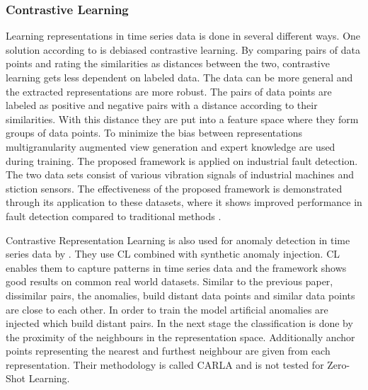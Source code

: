 
\subsubsection{Contrastive Learning}
Learning representations in time series data is done in several different ways. One solution according to  is debiased contrastive learning. By comparing pairs of data points and rating the similarities as distances between the two, contrastive learning gets less dependent on labeled data. The data can be more general and the extracted representations are more robust. The pairs of data points are labeled as positive and negative pairs with a distance according to their similarities. With this distance they are put into a feature space where they form groups of data points. To minimize the bias between representations multigranularity augmented view generation and expert knowledge are used during training. The proposed framework is applied on industrial fault detection. The two data sets consist of various vibration signals of industrial machines and stiction sensors. The effectiveness of the proposed framework is demonstrated through its application to these datasets, where it shows improved performance in fault detection compared to traditional methods .

Contrastive Representation Learning is also used for anomaly detection in time series data by . They use CL combined with synthetic anomaly injection. CL enables them to capture patterns in time series data and the framework shows good results on common real world datasets. Similar to the previous paper, dissimilar pairs, the anomalies, build distant data points and similar data points are close to each other. In order to train the model artificial anomalies are injected which build distant pairs. In the next stage the classification is done by  the proximity of the neighbours in the representation space. Additionally anchor points representing the nearest and furthest neighbour are given from each representation. Their methodology is called CARLA and is not tested for Zero-Shot Learning.%

